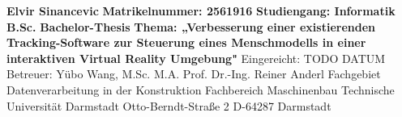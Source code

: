 \vspace*{\fill}
\begin{flushleft}
	\textbf{Elvir Sinancevic}
	\newline
	\textbf{Matrikelnummer: 2561916}
	\newline
	\textbf{Studiengang: Informatik B.Sc.}
	\newline\newline
	\textbf{Bachelor-Thesis}
	\newline
	\textbf{Thema: „Verbesserung einer existierenden Tracking-Software zur Steuerung eines Menschmodells in einer interaktiven Virtual Reality Umgebung"}
	\newline\newline
	Eingereicht: TODO DATUM
	\newline\newline
	Betreuer: Yübo Wang, M.Sc. M.A.
	\newline\newline
	Prof. Dr.-Ing. Reiner Anderl
	\newline
	Fachgebiet Datenverarbeitung in der Konstruktion
	\newline
	Fachbereich Maschinenbau
	\newline
	Technische Universität Darmstadt
	\newline
	Otto-Berndt-Straße 2
	\newline
	D-64287 Darmstadt	
\end{flushleft}
